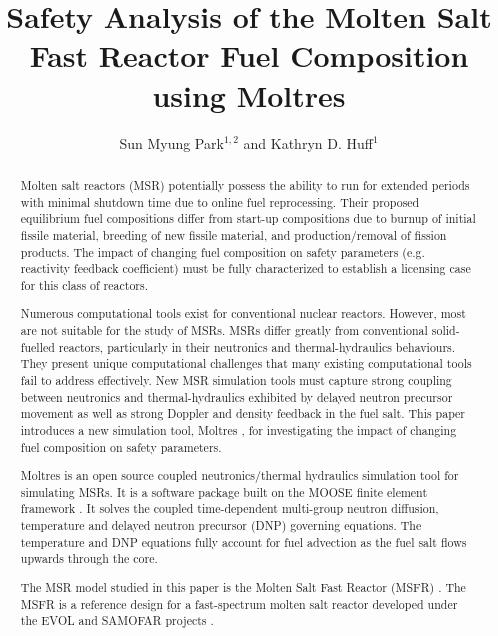 \documentclass{anstrans}
\title{Safety Analysis of the Molten Salt Fast Reactor Fuel Composition using Moltres}
\author{Sun Myung Park$^{1,2}$ and Kathryn D. Huff$^1$}
\institute{$^1$Dept. of Nuclear, Plasma and Radiological Engineering, University of Illinois at Urbana-Champaign \\
$^2$smpark3@illinois.edu}
\begin{document}
\begin{abstract}
%
Molten salt reactors (MSR) potentially possess the ability to run for extended periods with minimal shutdown time due to online fuel reprocessing.
Their proposed equilibrium fuel compositions differ from start-up compositions due to burnup of initial fissile material, breeding of new fissile material, and production/removal of fission products.
The impact of changing fuel composition on safety parameters (e.g. reactivity feedback coefficient) must be fully characterized to establish a licensing case for this class of reactors.

Numerous computational tools exist for conventional nuclear reactors.
However, most are not suitable for the study of MSRs.
MSRs differ greatly from conventional solid-fuelled reactors, particularly in their neutronics and thermal-hydraulics behaviours.
They present unique computational challenges that many existing computational tools fail to address effectively.
New MSR simulation tools must capture strong coupling between neutronics and thermal-hydraulics exhibited by delayed neutron precursor movement as well as strong Doppler and density feedback in the fuel salt.
This paper introduces a new simulation tool, Moltres \cite{lindsay_introduction_2018}, for investigating the impact of changing fuel composition on safety parameters.

Moltres is an open source coupled neutronics/thermal hydraulics simulation tool for simulating MSRs.
It is a software package built on the MOOSE finite element framework \cite{gaston_moose:_2009}.
It solves the coupled time-dependent multi-group neutron diffusion, temperature and delayed neutron precursor (DNP) governing equations.
The temperature and DNP equations fully account for fuel advection as the fuel salt flows upwards through the core.

The MSR model studied in this paper is the Molten Salt Fast Reactor (MSFR) \cite{merle-lucotte_launching_2011}.
The MSFR is a reference design for a fast-spectrum molten salt reactor developed under the EVOL and SAMOFAR projects \cite{serp_molten_2014}.


\end{abstract}
\end{document}
